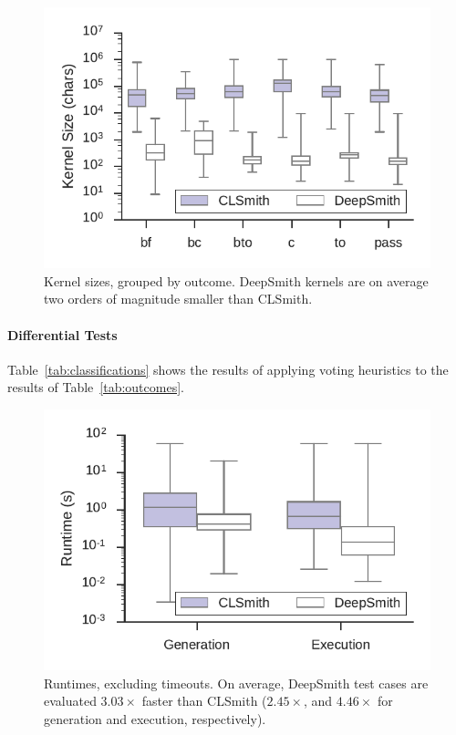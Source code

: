 \begin{figure}
  \centering %
  \includegraphics[width=.9\columnwidth]{build/img/kernel-sizes}%
  \caption{%
    Kernel sizes, grouped by outcome. DeepSmith kernels are on average two orders of magnitude smaller than CLSmith. %
  }%
  \label{fig:kernel-sizes} %
\end{figure}


\paragraph{Differential Tests}

Table~\ref{tab:classifications} shows the results of applying voting heuristics to the results of Table~\ref{tab:outcomes}.

\begin{figure}
  \centering %
  \includegraphics[width=.9\columnwidth]{build/img/runtimes}%
  \caption{%
    Runtimes, excluding timeouts. On average, DeepSmith test cases are evaluated $3.03\times$ faster than CLSmith ($2.45\times$, and $4.46\times$ for generation and execution, respectively).%
  }%
  \label{fig:runtimes} %
\end{figure}

